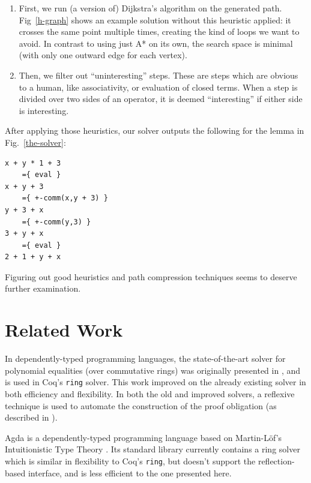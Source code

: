 \documentclass[acmsmall,review,anonymous]{acmart}\settopmatter{printfolios=true,printccs=false,printacmref=false}
\theoremstyle{remark}
\begin{document}
\begin{enumerate}
  \item First, we run (a version of) Dijkstra's algorithm on the generated path.
    Fig~\ref{h-graph} shows an example solution without this heuristic applied: 
    it crosses the same point multiple times, creating the kind of loops we want
    to avoid. In contrast to using just A* on its own, the search space is
    minimal (with only one outward edge for each vertex).
  \item Then, we filter out ``uninteresting'' steps. These are steps which are
    obvious to a human, like associativity, or evaluation of closed terms. When
    a step is divided over two sides of an operator, it is deemed
    ``interesting'' if either side is interesting.
\end{enumerate}

After applying those heuristics, our solver outputs the following for the lemma
in Fig.~\ref{the-solver}:
\begin{center}
\begin{BVerbatim}
x + y * 1 + 3
    ={ eval }
x + y + 3
    ={ +-comm(x,y + 3) }
y + 3 + x
    ={ +-comm(y,3) }
3 + y + x
    ={ eval }
2 + 1 + y + x
\end{BVerbatim}
\end{center}
Figuring out good heuristics and path compression techniques seems to deserve
further examination.
\section{Related Work}
In dependently-typed programming languages, the state-of-the-art solver for
polynomial equalities (over commutative rings) was originally presented
in \citet{gregoire_proving_2005}, and is used in Coq's \verb+ring+ solver. This
work improved on the already existing solver \cite{Coq:manual} in both efficiency
and flexibility. In both the old and improved solvers, a reflexive technique is
used to automate the construction of the proof obligation (as described in
\citet{boutin_using_1997}).

Agda \cite{norell_dependently_2008} is a dependently-typed programming language
based on Martin-Löf's Intuitionistic Type
Theory \cite{martin-lof_intuitionistic_1980}. Its standard
library \cite{danielsson_agda_2018} currently contains a ring solver which is
similar in flexibility to Coq's \verb+ring+, but doesn't support the
reflection-based interface, and is less efficient to the one presented here. 
\end{document}
